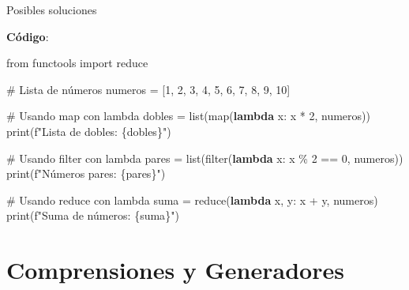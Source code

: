 \documentclass[
  a4paper,
  DIV=11,
  numbers=noendperiod,
  onepage,
  openany]{scrreprt}
\newenvironment{Shaded}{\begin{snugshade}}{\end{snugshade}}
\newcommand{\BuiltInTok}[1]{\textcolor[rgb]{0.00,0.23,0.31}{#1}}
\newcommand{\CommentTok}[1]{\textcolor[rgb]{0.37,0.37,0.37}{#1}}
\newcommand{\DecValTok}[1]{\textcolor[rgb]{0.68,0.00,0.00}{#1}}
\newcommand{\ImportTok}[1]{\textcolor[rgb]{0.00,0.46,0.62}{#1}}
\newcommand{\KeywordTok}[1]{\textcolor[rgb]{0.00,0.23,0.31}{\textbf{#1}}}
\newcommand{\NormalTok}[1]{\textcolor[rgb]{0.00,0.23,0.31}{#1}}
\newcommand{\OperatorTok}[1]{\textcolor[rgb]{0.37,0.37,0.37}{#1}}
\newcommand{\SpecialCharTok}[1]{\textcolor[rgb]{0.37,0.37,0.37}{#1}}
\newcommand{\SpecialStringTok}[1]{\textcolor[rgb]{0.13,0.47,0.30}{#1}}
\begin{document}
Posibles soluciones

\textbf{Código}:

\begin{Shaded}
\begin{Highlighting}[]
\ImportTok{from}\NormalTok{ functools }\ImportTok{import} \BuiltInTok{reduce}

\CommentTok{\# Lista de números}
\NormalTok{numeros }\OperatorTok{=}\NormalTok{ [}\DecValTok{1}\NormalTok{, }\DecValTok{2}\NormalTok{, }\DecValTok{3}\NormalTok{, }\DecValTok{4}\NormalTok{, }\DecValTok{5}\NormalTok{, }\DecValTok{6}\NormalTok{, }\DecValTok{7}\NormalTok{, }\DecValTok{8}\NormalTok{, }\DecValTok{9}\NormalTok{, }\DecValTok{10}\NormalTok{]}

\CommentTok{\# Usando map con lambda}
\NormalTok{dobles }\OperatorTok{=} \BuiltInTok{list}\NormalTok{(}\BuiltInTok{map}\NormalTok{(}\KeywordTok{lambda}\NormalTok{ x: x }\OperatorTok{*} \DecValTok{2}\NormalTok{, numeros))}
\BuiltInTok{print}\NormalTok{(}\SpecialStringTok{f"Lista de dobles: }\SpecialCharTok{\{}\NormalTok{dobles}\SpecialCharTok{\}}\SpecialStringTok{"}\NormalTok{)}

\CommentTok{\# Usando filter con lambda}
\NormalTok{pares }\OperatorTok{=} \BuiltInTok{list}\NormalTok{(}\BuiltInTok{filter}\NormalTok{(}\KeywordTok{lambda}\NormalTok{ x: x }\OperatorTok{\%} \DecValTok{2} \OperatorTok{==} \DecValTok{0}\NormalTok{, numeros))}
\BuiltInTok{print}\NormalTok{(}\SpecialStringTok{f"Números pares: }\SpecialCharTok{\{}\NormalTok{pares}\SpecialCharTok{\}}\SpecialStringTok{"}\NormalTok{)}

\CommentTok{\# Usando reduce con lambda}
\NormalTok{suma }\OperatorTok{=} \BuiltInTok{reduce}\NormalTok{(}\KeywordTok{lambda}\NormalTok{ x, y: x }\OperatorTok{+}\NormalTok{ y, numeros)}
\BuiltInTok{print}\NormalTok{(}\SpecialStringTok{f"Suma de números: }\SpecialCharTok{\{}\NormalTok{suma}\SpecialCharTok{\}}\SpecialStringTok{"}\NormalTok{)}
\end{Highlighting}
\end{Shaded}

\chapter{Comprensiones y Generadores}\label{comprensiones-y-generadores}
\end{document}
